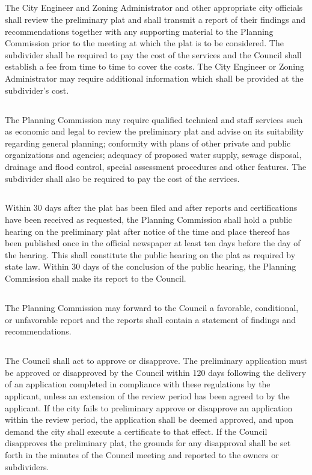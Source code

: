 \subsection{}
The City Engineer and Zoning Administrator and other appropriate city officials shall review the preliminary plat and shall transmit a report of their findings and recommendations together with any supporting material to the Planning Commission prior to the meeting at which the plat is to be considered. The subdivider shall be required to pay the cost of the services and the Council shall establish a fee from time to time to cover the costs. The City Engineer or Zoning Administrator may require additional information which shall be provided at the subdivider’s cost.
\subsection{}
The Planning Commission may require qualified technical and staff services such as economic and legal to review the preliminary plat and advise on its suitability regarding general planning; conformity with plans of other private and public organizations and agencies; adequacy of proposed water supply, sewage disposal, drainage and flood control, special assessment procedures and other features. The subdivider shall also be required to pay the cost of the services.
\subsection{}
Within 30 days after the plat has been filed and after reports and certifications have been received as requested, the Planning Commission shall hold a public hearing on the preliminary plat after notice of the time and place thereof has been published once in the official newspaper at least ten days before the day of the hearing. This shall constitute the public hearing on the plat as required by state law. Within 30 days of the conclusion of the public hearing, the Planning Commission shall make its report to the Council.
\subsection{}
The Planning Commission may forward to the Council a favorable, conditional, or unfavorable report and the reports shall contain a statement of findings and recommendations.
\subsection{}
The Council shall act to approve or disapprove. The preliminary application must be approved or disapproved by the Council within 120 days following the delivery of an application completed in compliance with these regulations by the applicant, unless an extension of the review period has been agreed to by the applicant. If the city fails to preliminary approve or disapprove an application within the review period, the application shall be deemed approved, and upon demand the city shall execute a certificate to that effect. If the Council disapproves the preliminary plat, the grounds for any disapproval shall be set forth in the minutes of the Council meeting and reported to the owners or subdividers.
